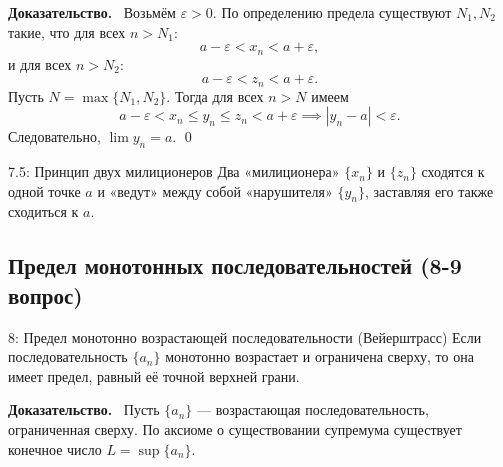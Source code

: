 \documentclass[a4paper,12pt]{article}
\newcommand{\myproof}{\textbf{Доказательство.}\ }
\begin{document}
	\myproof
	Возьмём $\varepsilon > 0$. По определению предела существуют $N_1, N_2$ такие, что для всех $n > N_1$:
	\[
	a - \varepsilon < x_n < a + \varepsilon,
	\]
	и для всех $n > N_2$:
	\[
	a - \varepsilon < z_n < a + \varepsilon.
	\]
	Пусть $N = \max\{N_1, N_2\}$. Тогда для всех $n > N$ имеем
	\[
	a - \varepsilon < x_n \le y_n \le z_n < a + \varepsilon \implies |y_n - a| < \varepsilon.
	\]
	Следовательно, $\lim y_n = a$. \qed
	
	\begin{center}
	\end{center}
	
	\begin{notebook}{7.5: Принцип двух милиционеров}
		Два «милиционера» $\{x_n\}$ и $\{z_n\}$ сходятся к одной точке $a$ и «ведут» между собой «нарушителя» $\{y_n\}$, заставляя его также сходиться к $a$.
	\end{notebook}
	
	
	
	
	
	\newpage
	\subsection{Предел монотонных последовательностей (8-9 вопрос)}
	
	\begin{theorembox}{8: Предел монотонно возрастающей последовательности (Вейерштрасс)}
		Если последовательность $\{a_n\}$ монотонно возрастает и ограничена сверху, то она имеет предел, равный её точной верхней грани.
	\end{theorembox}
	
	\myproof
	Пусть $\{a_n\}$ — возрастающая последовательность, ограниченная сверху. По аксиоме о существовании супремума существует конечное число $L = \sup \{a_n\}$. 
	
\end{document}

